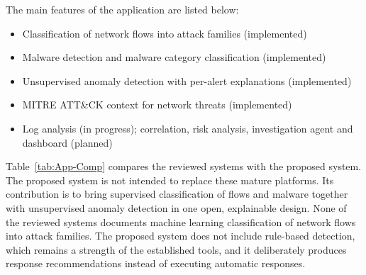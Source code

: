 The main features of the application are listed below:
\begin{itemize}
    \setlength{\itemsep}{1pt}
    \setlength{\parskip}{0pt}
    \setlength{\parsep}{0pt}
    \item Classification of network flows into attack families (implemented)
    \item Malware detection and malware category classification (implemented)
    \item Unsupervised anomaly detection with per-alert explanations (implemented)
    \item MITRE ATT\&CK context for network threats (implemented)
    \item Log analysis (in progress); correlation, risk analysis, investigation agent and dashboard (planned)
\end{itemize}

Table~\ref{tab:App-Comp} compares the reviewed systems with the proposed system. The proposed system is not intended to replace these mature platforms. Its contribution is to bring supervised classification of flows and malware together with unsupervised anomaly detection in one open, explainable design. None of the reviewed systems documents machine learning classification of network flows into attack families. The proposed system does not include rule-based detection, which remains a strength of the established tools, and it deliberately produces response recommendations instead of executing automatic responses.

